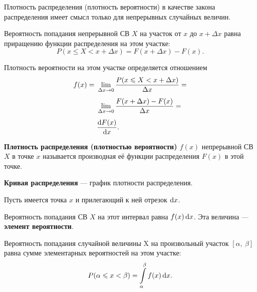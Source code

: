 \documentclass[a4paper]{article}
\newcommand{\sleq}{\leqslant}
\newcommand{\key}[1]{{\bfseries\color{Medium} #1}}
\begin{document}
                Плотность распределения (плотность вероятности) в качестве закона распределения имеет смысл только для непрерывных случайных величин.
                
                Вероятность попадания непрерывной СВ $X$ на участок $\text{от } x \text{ до } x + \Delta x$ равна приращению функции распределения на этом участке:
                \begin{equation*}
                    P(x \sleq X < x + \Delta x) = F(x + \Delta x) - F(x) .
                \end{equation*}
                
                Плотность вероятности на этом участке определяется отношением
                \begin{equation*}
                    \begin{aligned}
                        f(x) = ~& \lim\limits_{\Delta x \to 0}
                            \frac{P(x \sleq X < x + \Delta x)}{\Delta x} = \\[1.0ex]
                        & \lim\limits_{\Delta x \to 0}
                            \frac{F(x + \Delta x) - F(x)}{\Delta x} = \\[1.0ex]
                        & \frac{\dif F(x)}{\dif x} .
                    \end{aligned}
                \end{equation*}

                \key{Плотность распределения (плотностью вероятности) \boldmath$f(x)$} непрерывной СВ $X$ в точке $x$ называется производная её функции распределения $F(x)$ в этой точке.
                
                \key{Кривая распределения} --- график плотности распределения.

                Пусть имеется точка $x$ и прилегающий к ней отрезок $\dif x $.
                
                Вероятность попадания СВ $X$ на этот интервал равна $f(x) \dif x$. Эта величина --- \key{элемент вероятности}.
                
                Вероятность попадания случайной величины X на произвольный участок $[\alpha , \: \beta]$ равна сумме элементарных вероятностей на этом участке:
                \begin{equation*}
                    P(\alpha \sleq x < \beta) = \int\limits_{\alpha}^{\beta} f(x) \dif x .
                \end{equation*}
\end{document}
